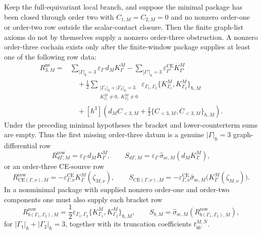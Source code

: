 \begin{prop}\label{prop:app-first-order-three-larger-package-datum}
  Keep the full-equivariant local branch, and suppose the minimal package has
  been closed through order two with
  \(C_{1,M}=C_{2,M}=0\) and no nonzero order-one or order-two row outside the
  scalar-contact closure.  Then the finite graph-list axioms do not by
  themselves supply a nonzero order-three obstruction.  A nonzero order-three
  cochain exists only after the finite-window package supplies at least one
  of the following row data:
  \[
  \begin{aligned}
    R^{\mathrm{ns}}_{3,M}
      ={}&
      \sum_{|\Gamma|_\hbar=3}
        \varepsilon_\Gamma\,d_M K^M_\Gamma
      -\sum_{|\Gamma'|_\hbar=3}
        \varepsilon^{\mathrm{CE}}_{\Gamma'}K^M_{\Gamma'}\\
      &\quad
      +\frac12
      \sum_{\substack{|\Gamma_1|_\hbar+|\Gamma_2|_\hbar=3\\
        K^M_{\Gamma_1}\neq0,\;K^M_{\Gamma_2}\neq0}}
        \varepsilon_{\Gamma_1,\Gamma_2}
        \{K^M_{\Gamma_1},K^M_{\Gamma_2}\}_{\hbar,M}\\
      &\quad
      +[\hbar^3]\left(
        d_M C_{<3,M}
        +\frac12\{C_{<3,M},C_{<3,M}\}_{\hbar,M}\right).
  \end{aligned}
  \]
  Under the preceding minimal hypotheses the bracket and lower-counterterm
  sums are empty.  Thus the first missing order-three datum is a genuine
  \(|\Gamma|_\hbar=3\) graph-differential row
  \[
    R^{\mathrm{row}}_{d\Gamma,M}
      =
    \varepsilon_\Gamma\,d_M K^M_\Gamma,
    \qquad
    S_{d\Gamma,M}
      =
    \varepsilon_\Gamma\,\widehat\sigma_{\mathrm{sc},M}(d_M K^M_\Gamma),
  \]
  or an order-three CE-source row
  \[
    R^{\mathrm{row}}_{\mathrm{CE}(\Gamma,\nu),M}
      =
    -\varepsilon^{\mathrm{CE}}_{\Gamma,\nu}
      K^M_\Gamma(\zeta_{M,\nu}),
    \qquad
    S_{\mathrm{CE}(\Gamma,\nu),M}
      =
    -\varepsilon^{\mathrm{CE}}_{\Gamma,\nu}
      \widehat\sigma_{\mathrm{sc},M}
      \bigl(K^M_\Gamma(\zeta_{M,\nu})\bigr).
  \]
  In a nonminimal package with supplied nonzero order-one and order-two
  components one must also supply each bracket row
  \[
    R^{\mathrm{row}}_{b(\Gamma_1,\Gamma_2),M}
      =
    \frac12\varepsilon_{\Gamma_1,\Gamma_2}
    \{K^M_{\Gamma_1},K^M_{\Gamma_2}\}_{\hbar,M},
    \qquad
    S_{b,M}
      =
    \widehat\sigma_{\mathrm{sc},M}
      (R^{\mathrm{row}}_{b(\Gamma_1,\Gamma_2),M}),
  \]
  for \(|\Gamma_1|_\hbar+|\Gamma_2|_\hbar=3\), together with its
  truncation coefficients \(t^{M,N}_{bb'}\).


\end{prop}
